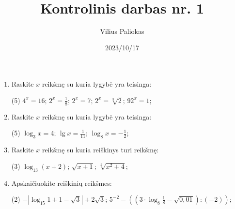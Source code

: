 \documentclass[a4paper]{article}
\title{Kontrolinis darbas nr. 1}
\author{Vilius Paliokas}
\date{2023/10/17}
\begin{document}
\thispagestyle{empty} 
\begin{enumerate}
      \item Raskite $x$ reikšmę su kuria lygybė yra teisinga:
      
      \begin{tasks}[item-format={\normalfont}, after-item-skip=4mm](5)
            \task $4^{x}=16$;
            \task $2^{x}=\frac{1}{8}$;
            \task $2^{x}=7$;
            \task $2^{x}=\sqrt[5]{2}$;
            \task $92^{x}=1$;
      \end{tasks}

      \item Raskite $x$  reikšmę su kuria lygybė yra teisinga:
      \begin{tasks}[item-format={\normalfont}, after-item-skip=4mm](5)
            \task $\log_{3} x=4$;
            \task $\lg x=\frac{1}{11}$;
            \task $\log_{8} x=-\frac{1}{2}$;
      \end{tasks}
      \item Raskite $x$  reikšmę su kuria reiškinys turi reikšmę:
      \begin{tasks}[item-format={\normalfont}, after-item-skip=4mm](3)
            \task $\log_{13} (x+2)$;
            \task $\sqrt{x+1}$;
            \task $\sqrt[5]{x^{2}+4}$;
      \end{tasks}
      \item Apskaičiuokite reiškinių reikšmes:
      \begin{tasks}[item-format={\normalfont}, after-item-skip=10mm](2)
            \task $-\left|\log_{15}1+1-\sqrt{3}\right|+2\sqrt{3}$;
            \task $5^{-2} - ((3 \cdot \log_{8}\frac{1}{8}-\sqrt{0,01}):(-2))$;
      \end{tasks}
\end{enumerate} 
\end{document}
